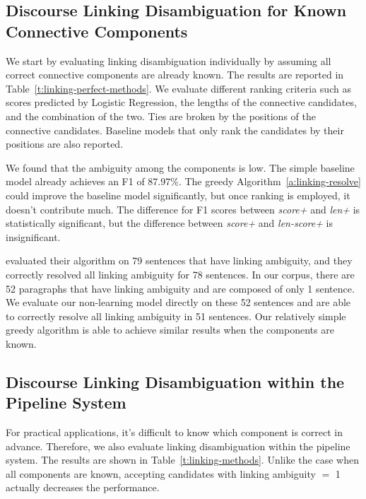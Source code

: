 \subsection{Discourse Linking Disambiguation for Known Connective Components}

We start by evaluating linking disambiguation individually by assuming all correct
connective components are already known. The results are reported in
Table~\ref{t:linking-perfect-methods}.
We evaluate different ranking criteria such as scores predicted by
Logistic Regression, the lengths of the connective candidates, and the combination
of the two. Ties are broken by the positions of the connective candidates.
Baseline models that only rank the candidates by their positions are also reported.

We found that the ambiguity among the components is low. The simple
baseline model already achieves an F1 of 87.97\%. The greedy
Algorithm~\ref{a:linking-resolve} could improve the baseline
model significantly, but once ranking is employed, it doesn't contribute much.
The difference for F1 scores between \textit{score+} and \textit{len+} is statistically
significant, but the difference between \textit{score+} and \textit{len-score+}
is insignificant.




\cite{hu2011research} evaluated their algorithm on 79 sentences that have
linking ambiguity, and they correctly resolved all linking ambiguity for 78
sentences. In our corpus, there are 52 paragraphs that have linking ambiguity
and are composed of only 1 sentence. We evaluate our non-learning  model
directly on these 52 sentences and are able to correctly resolve all linking
ambiguity in 51 sentences. Our relatively simple greedy algorithm is
able to achieve similar results when the components are known.

\subsection{Discourse Linking Disambiguation within the Pipeline System}

For practical applications, it's difficult to know which component is correct in
advance. Therefore, we also evaluate linking disambiguation within the pipeline
system. The results are shown in Table~\ref{t:linking-methods}. Unlike the case
when all components are known, accepting candidates with linking ambiguity $=$ 1 actually
decreases the performance.

